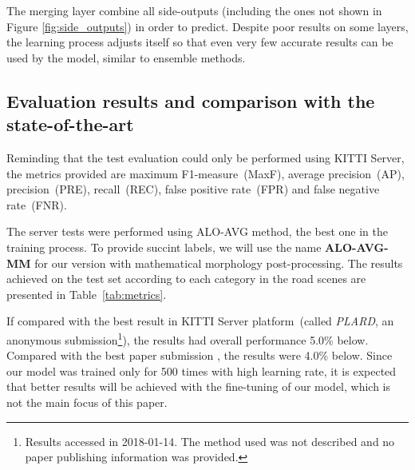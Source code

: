 The merging layer combine all side-outputs (including the ones not shown in Figure \ref{fig:side_outputs}) in order to predict. Despite poor results on some layers, the learning process adjusts itself so that even very few accurate results can be used by the model, similar to ensemble methods.


\subsection{Evaluation results and comparison with the state-of-the-art}

Reminding that the test evaluation could only be performed using KITTI Server, the metrics provided are maximum F1-measure~(MaxF), average precision~(AP), precision~(PRE), recall~(REC), false positive rate~(FPR) and false negative rate~(FNR). 

The server tests were performed using ALO-AVG method, the best one in the training process. To provide succint labels, we will use the name \textbf{ALO-AVG-MM} for our version with mathematical morphology post-processing. The results achieved  on the test set according to each category in the road scenes are presented in Table~\ref{tab:metrics}. 

If compared with the best result in KITTI Server platform~(called \textit{PLARD}, an anonymous submission\footnote{Results accessed in 2018-01-14. The method used was not described and no paper publishing information was provided.}), the results had overall performance 5.0\% below. Compared with the best paper submission \cite{Caltagirone2018}, the results were 4.0\% below. Since our model was trained only for 500 times with high learning rate, it is expected that better results will be achieved with the fine-tuning of our model, which is not the main focus of this paper. %

